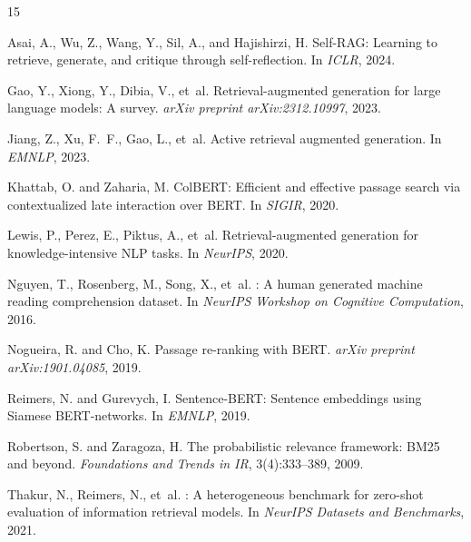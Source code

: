 \documentclass[11pt,a4paper]{article}
\begin{document}
\begin{thebibliography}{15}

Asai, A., Wu, Z., Wang, Y., Sil, A., and Hajishirzi, H.
\newblock Self-RAG: Learning to retrieve, generate, and critique
through self-reflection.
\newblock In \emph{ICLR}, 2024.

Gao, Y., Xiong, Y., Dibia, V., et~al.
\newblock Retrieval-augmented generation for large language models: A
survey.
\newblock \emph{arXiv preprint arXiv:2312.10997}, 2023.

Jiang, Z., Xu, F.~F., Gao, L., et~al.
\newblock Active retrieval augmented generation.
\newblock In \emph{EMNLP}, 2023.

Khattab, O. and Zaharia, M.
\newblock ColBERT: Efficient and effective passage search via
contextualized late interaction over BERT.
\newblock In \emph{SIGIR}, 2020.

Lewis, P., Perez, E., Piktus, A., et~al.
\newblock Retrieval-augmented generation for knowledge-intensive NLP
tasks.
\newblock In \emph{NeurIPS}, 2020.

Nguyen, T., Rosenberg, M., Song, X., et~al.
: A human generated machine reading comprehension
dataset.
\newblock In \emph{NeurIPS Workshop on Cognitive Computation}, 2016.

Nogueira, R. and Cho, K.
\newblock Passage re-ranking with BERT.
\newblock \emph{arXiv preprint arXiv:1901.04085}, 2019.

Reimers, N. and Gurevych, I.
\newblock Sentence-BERT: Sentence embeddings using Siamese
BERT-networks.
\newblock In \emph{EMNLP}, 2019.

Robertson, S. and Zaragoza, H.
\newblock The probabilistic relevance framework: {BM25} and beyond.
\newblock \emph{Foundations and Trends in IR}, 3(4):333--389, 2009.

Thakur, N., Reimers, N., et~al.
: A heterogeneous benchmark for zero-shot evaluation
of information retrieval models.
\newblock In \emph{NeurIPS Datasets and Benchmarks}, 2021.


\end{thebibliography}
\end{document}
